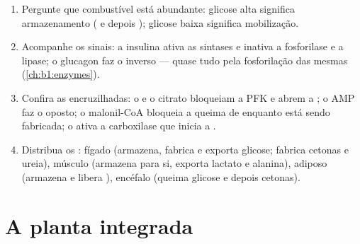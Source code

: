 \begin{method}\label{met:b1:biosyntheses-integration:state}
\begin{enumerate}
  \item Pergunte que combustível está abundante: glicose alta significa
        armazenamento ( e depois ); glicose baixa
        significa mobilização.
  \item Acompanhe os sinais: a insulina ativa as sintases e inativa a
        fosforilase e a lipase; o glucagon faz o inverso --- quase tudo
        pela fosforilação das mesmas  (\cref{ch:b1:enzymes}).
  \item Confira as encruzilhadas: o  e o citrato bloqueiam a PFK e
        abrem a ; o AMP faz o oposto; o malonil-CoA
        bloqueia a queima de  enquanto  está sendo
        fabricada; o  ativa a carboxilase que inicia a
        .
  \item Distribua os : fígado (armazena, fabrica e exporta
        glicose; fabrica cetonas e ureia), músculo (armazena 
        para si, exporta lactato e alanina),  adiposo (armazena e
        libera ), encéfalo (queima glicose e depois cetonas).
\end{enumerate}
\end{method}

\section{A planta integrada}

